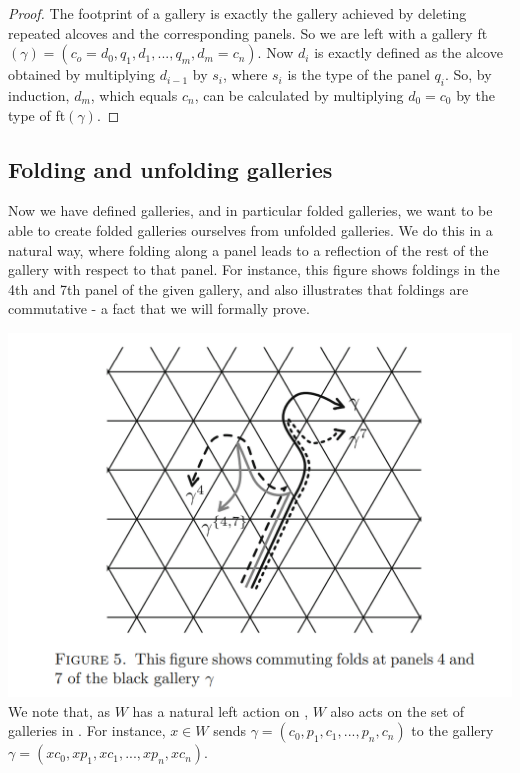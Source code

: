 \documentclass[11pt]{article}
\begin{document}
\begin{proof}
    The footprint of a gallery is exactly the gallery achieved by deleting repeated alcoves and the corresponding panels. So we are left with a gallery ft$(\gamma)=(c_o=d_0,q_1,d_1,...,q_m,d_m=c_n)$. Now $d_i$ is exactly defined as the alcove obtained by multiplying $d_{i-1}$ by $s_i$, where $s_i$ is the type of the panel $q_i$. So, by induction, $d_m$, which equals $c_n$, can be calculated by multiplying $d_0=c_0$ by the type of ft$(\gamma)$. 
\end{proof}

\subsection{Folding and unfolding galleries}

Now we have defined galleries, and in particular folded galleries, we want to be able to create folded galleries ourselves from unfolded galleries. We do this in a natural way, where folding along a panel leads to a reflection of the rest of the gallery with respect to that panel. For instance, this figure shows foldings in the 4th and 7th panel of the given gallery, and also illustrates that foldings are commutative - a fact that we will formally prove.

\includegraphics[scale=0.6]{Screenshot 2023-02-03 153412.png}\\

We note that, as $W$ has a natural left action on \sg, $W$ also acts on the set of galleries in \sg. For instance, $x\in W$ sends $\gamma = (c_0,p_1,c_1,...,p_n,c_n)$ to the gallery $\gamma = (xc_0,xp_1,xc_1,...,xp_n,xc_n)$. 
\end{document}
